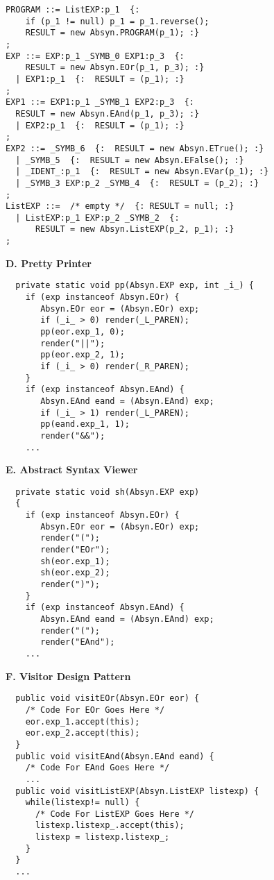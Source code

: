 \begin{figure}
\begin{boxedminipage}[t]{\textwidth}
\begin{minipage}[l]{0.5\textwidth}
\begin{verbatim}
PROGRAM ::= ListEXP:p_1  {: 
    if (p_1 != null) p_1 = p_1.reverse();
    RESULT = new Absyn.PROGRAM(p_1); :} 
;
EXP ::= EXP:p_1 _SYMB_0 EXP1:p_3  {: 
    RESULT = new Absyn.EOr(p_1, p_3); :} 
  | EXP1:p_1  {:  RESULT = (p_1); :}
;
EXP1 ::= EXP1:p_1 _SYMB_1 EXP2:p_3  {:
  RESULT = new Absyn.EAnd(p_1, p_3); :} 
  | EXP2:p_1  {:  RESULT = (p_1); :}
;
EXP2 ::= _SYMB_6  {:  RESULT = new Absyn.ETrue(); :} 
  | _SYMB_5  {:  RESULT = new Absyn.EFalse(); :}
  | _IDENT_:p_1  {:  RESULT = new Absyn.EVar(p_1); :}
  | _SYMB_3 EXP:p_2 _SYMB_4  {:  RESULT = (p_2); :}
;
ListEXP ::=  /* empty */  {: RESULT = null; :} 
  | ListEXP:p_1 EXP:p_2 _SYMB_2  {:
      RESULT = new Absyn.ListEXP(p_2, p_1); :}
;
\end{verbatim}
\normalsize
\end{minipage}
\hfill
\begin{minipage}[r]{0.5\textwidth}
\textbf{D. Pretty Printer}
\scriptsize
\begin{verbatim}
  private static void pp(Absyn.EXP exp, int _i_) {
    if (exp instanceof Absyn.EOr) {
       Absyn.EOr eor = (Absyn.EOr) exp;
       if (_i_ > 0) render(_L_PAREN);
       pp(eor.exp_1, 0);
       render("||");
       pp(eor.exp_2, 1);
       if (_i_ > 0) render(_R_PAREN);
    }
    if (exp instanceof Absyn.EAnd) {
       Absyn.EAnd eand = (Absyn.EAnd) exp;
       if (_i_ > 1) render(_L_PAREN);
       pp(eand.exp_1, 1);
       render("&&");
    ...
\end{verbatim}
\normalsize
\textbf{E. Abstract Syntax Viewer}
\scriptsize
\begin{verbatim}
  private static void sh(Absyn.EXP exp)
  {
    if (exp instanceof Absyn.EOr) {
       Absyn.EOr eor = (Absyn.EOr) exp;
       render("(");
       render("EOr");
       sh(eor.exp_1);
       sh(eor.exp_2);
       render(")");
    }
    if (exp instanceof Absyn.EAnd) {
       Absyn.EAnd eand = (Absyn.EAnd) exp;
       render("(");
       render("EAnd");
    ...
\end{verbatim}
\normalsize

\textbf{F. Visitor Design Pattern}

\scriptsize
\begin{verbatim}
  public void visitEOr(Absyn.EOr eor) {
    /* Code For EOr Goes Here */
    eor.exp_1.accept(this);
    eor.exp_2.accept(this);
  }
  public void visitEAnd(Absyn.EAnd eand) {
    /* Code For EAnd Goes Here */
    ...
  public void visitListEXP(Absyn.ListEXP listexp) {
    while(listexp!= null) {
      /* Code For ListEXP Goes Here */
      listexp.listexp_.accept(this);
      listexp = listexp.listexp_;
    }
  }
  ...
\end{verbatim}
\normalsize


\end{minipage}
\end{boxedminipage}
\end{figure}
